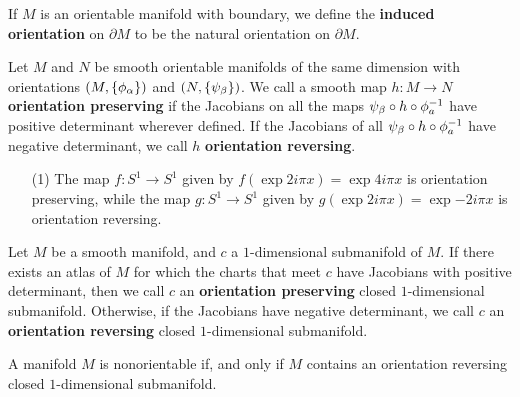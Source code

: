 \begin{definition}
    If $M$ is an orientable manifold with boundary, we define the
    \textbf{induced orientation} on $\partial{M}$ to be the natural orientation
    on $\partial{M}$.
\end{definition}

\begin{definition}
    Let $M$ and  $N$ be smooth orientable manifolds of the same dimension with
    orientations $(M,\{\phi_\alpha\})$ and $(N,\{\psi_\beta\})$. We call a smooth map
    $h:M \xrightarrow{} N$ \textbf{orientation preserving} if the Jacobians on
    all the maps $\psi_\beta \circ h \circ \phi_a^{-1}$ have positive determinant
    wherever defined. If the Jacobians of all $\psi_\beta \circ h \circ
    \phi_a^{-1}$ have negative determinant, we call $h$  \textbf{orientation
    reversing}.
\end{definition}

\begin{example}\label{example_1.10}
    \begin{enumerate}
        \item[(1)] The map $f:S^1 \xrightarrow{} S^1$ given by $f(\exp{2i\pi
            x})=\exp{4i\pi x}$ is orientation preserving, while the map $g:S^1
            \xrightarrow{} S^1$ given by $g(\exp{2i\pi x})=\exp{-2i\pi x}$ is
            orientation reversing.
    \end{enumerate}
\end{example}

\begin{definition}
    Let $M$ be a smooth manifold, and  $c$ a  $1$-dimensional submanifold of
    $M$. If there exists an atlas of  $M$ for which the charts that meet  $c$
    have Jacobians with positive determinant, then we call  $c$ an
    \textbf{orientation preserving} closed $1$-dimensional submanifold.
    Otherwise, if the Jacobians have negative determinant, we call $c$ an
    \textbf{orientation reversing} closed $1$-dimensional submanifold.
\end{definition}

\begin{lemma}\label{1.3.1}
    A manifold $M$ is nonorientable if, and only if  $M$ contains an orientation
    reversing closed  $1$-dimensional submanifold.
\end{lemma}
